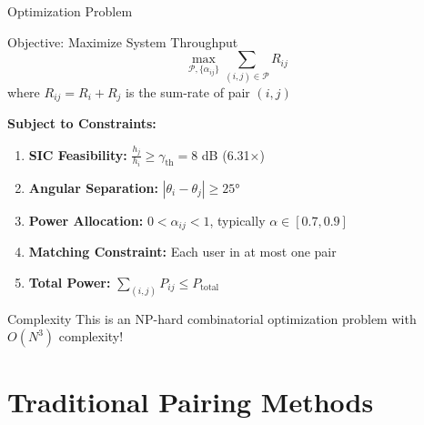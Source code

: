 \documentclass[aspectratio=169]{beamer}
\begin{document}
\begin{frame}{Optimization Problem}
    \begin{block}{Objective: Maximize System Throughput}
        \begin{equation*}
            \max_{\mathcal{P}, \{\alpha_{ij}\}} \sum_{(i,j) \in \mathcal{P}} R_{ij}
        \end{equation*}
        where $R_{ij} = R_i + R_j$ is the sum-rate of pair $(i,j)$
    \end{block}
    
    \vspace{0.3cm}
    
    \textbf{Subject to Constraints:}
    \begin{enumerate}
        \item \textbf{SIC Feasibility:} $\frac{h_j}{h_i} \geq \gamma_{\text{th}} = 8$ dB (6.31×)
        
        \item \textbf{Angular Separation:} $|\theta_i - \theta_j| \geq 25°$
        
        \item \textbf{Power Allocation:} $0 < \alpha_{ij} < 1$, typically $\alpha \in [0.7, 0.9]$
        
        \item \textbf{Matching Constraint:} Each user in at most one pair
        
        \item \textbf{Total Power:} $\sum_{(i,j)} P_{ij} \leq P_{\text{total}}$
    \end{enumerate}
    
    \vspace{0.2cm}
    
    \begin{alertblock}{Complexity}
        This is an NP-hard combinatorial optimization problem with $O(N^3)$ complexity!
    \end{alertblock}
\end{frame}

\section{Traditional Pairing Methods}
\end{document}
